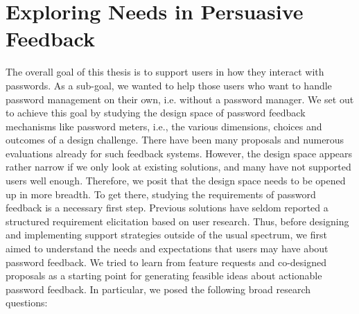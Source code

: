 \chapter[Exploring Needs in Persuasive Feedback] {Exploring Needs in Persuasive Feedback}\label{chap:feedback_modalities}




The overall goal of this thesis is to support users in how they interact with passwords. As a sub-goal, we wanted to help those users who want to handle password management on their own, i.e. without a password manager. We set out to achieve this goal by studying the design space of password feedback mechanisms like password meters, i.e., the various dimensions, choices and outcomes of a design challenge. There have been many proposals and numerous evaluations already for such feedback systems. However, the design space appears rather narrow if we only look at existing solutions, and many have not supported users well enough. Therefore, we posit that the design space needs to be opened up in more breadth. To get there, studying the requirements of password feedback is a necessary first step. Previous solutions have seldom reported a structured requirement elicitation based on user research. Thus, before designing and implementing support strategies outside of the usual spectrum, we first aimed to understand the needs and expectations that users may have about password feedback. We tried to learn from feature requests and co-designed proposals as a starting point for generating feasible ideas about actionable password feedback. In particular, we posed the following broad research questions:

